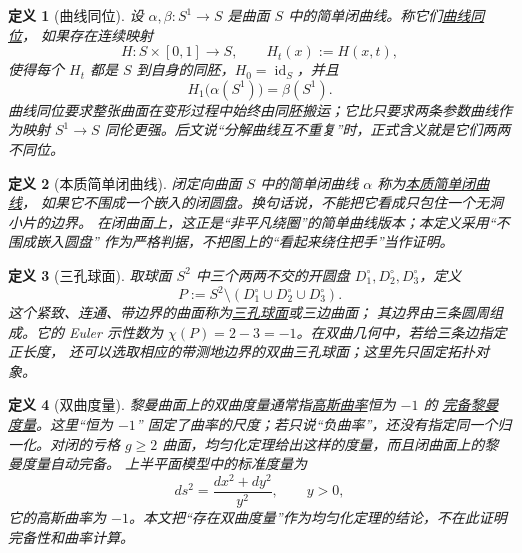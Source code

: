 \documentclass[UTF8,fontset=none,a4paper,11pt]{ctexart}
\theoremstyle{foundation-definition}
\newtheorem{definition}{定义}[section]
\theoremstyle{foundation-theorem}
\theoremstyle{foundation-proposition}
\theoremstyle{foundation-example}
\theoremstyle{foundation-remark}
\theoremstyle{foundation-theorem}
\newcommand{\term}[2]{\hyperref[#1]{#2}}
\begin{document}
\begin{definition}[曲线同位]\label{def:curve-isotopy}
设 \(\alpha,\beta:S^1\to S\) 是曲面 \(S\) 中的简单闭曲线。称它们\term{def:curve-isotopy}{曲线同位}，
如果存在连续映射
\[
H:S\times[0,1]\longrightarrow S,\qquad H_t(x):=H(x,t),
\]
使得每个 \(H_t\) 都是 \(S\) 到自身的同胚，\(H_0=\operatorname{id}_S\)，并且
\[
H_1\bigl(\alpha(S^1)\bigr)=\beta(S^1).
\]
曲线同位要求整张曲面在变形过程中始终由同胚搬运；它比只要求两条参数曲线作为映射
\(S^1\to S\) 同伦更强。后文说“分解曲线互不重复”时，正式含义就是它们两两不同位。
\end{definition}

\begin{definition}[本质简单闭曲线]\label{def:essential-simple-closed-curve}
闭定向曲面 \(S\) 中的简单闭曲线 \(\alpha\) 称为\term{def:essential-simple-closed-curve}{本质简单闭曲线}，
如果它不围成一个嵌入的闭圆盘。换句话说，不能把它看成只包住一个无洞小片的边界。
在闭曲面上，这正是“非平凡绕圈”的简单曲线版本；本定义采用“不围成嵌入圆盘”
作为严格判据，不把图上的“看起来绕住把手”当作证明。
\end{definition}

\begin{definition}[三孔球面]\label{def:pair-of-pants}
取球面 \(S^2\) 中三个两两不交的开圆盘 \(D_1^\circ,D_2^\circ,D_3^\circ\)，定义
\[
P:=S^2\setminus(D_1^\circ\cup D_2^\circ\cup D_3^\circ).
\]
这个紧致、连通、带边界的曲面称为\term{def:pair-of-pants}{三孔球面}或三边曲面；
其边界由三条圆周组成。它的 Euler 示性数为
\(\chi(P)=2-3=-1\)。在双曲几何中，若给三条边指定正长度，
还可以选取相应的带测地边界的双曲三孔球面；这里先只固定拓扑对象。
\end{definition}

\begin{definition}[双曲度量]\label{def:hyperbolic-metric}
黎曼曲面上的双曲度量通常指\term{def:gaussian-curvature}{高斯曲率}恒为 \(-1\) 的
\term{def:riemannian-completeness}{完备黎曼度量}。这里“恒为 \(-1\)”
固定了曲率的尺度；若只说“负曲率”，还没有指定同一个归一化。对闭的亏格
\(g\geq2\) 曲面，均匀化定理给出这样的度量，而且闭曲面上的黎曼度量自动完备。
上半平面模型中的标准度量为
\[
ds^2=\frac{dx^2+dy^2}{y^2},\qquad y>0,
\]
它的高斯曲率为 \(-1\)。本文把“存在双曲度量”作为均匀化定理的结论，不在此证明
完备性和曲率计算。
\end{definition}
\end{document}
